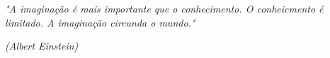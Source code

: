 \begin{epigrafe}
	\vspace*{\fill}
	\begin{flushright}
		\textit{"A imaginação é mais importante que o conhecimento. O conheicmento é limitado. A imaginação circunda o mundo."}   

        \textit{(Albert Einstein)}
	\end{flushright}
\end{epigrafe}